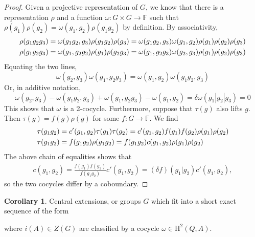 \documentclass{article}
\theoremstyle{definition}
\theoremstyle{definition}
\newtheorem{cor}{Corollary}
\newcommand{\F}{\mathbb F}
\newcommand{\cohom}{\mathrm H}
\begin{document}
\begin{proof}
Given a projective representation of $G$, we know that there is a representation $\rho$ and a function $\omega : G \times G \to \F$ such that $\rho(g_1)\rho(g_2) = \omega(g_1, g_2)\rho(g_1g_2)$ by definition. By associativity,
\begin{align}
\rho(g_1g_2g_3) &= \omega(g_1g_2, g_3)\rho(g_1g_2)\rho(g_3) = \omega(g_1g_2, g_3)\omega(g_1, g_2)\rho(g_1)\rho(g_2)\rho(g_3) \notag \\
\rho(g_1g_2g_3) &= \omega(g_1, g_2g_2)\rho(g_1)\rho(g_2g_3) = \omega(g_1, g_2g_3)\omega(g_2,g_3)\rho(g_1)\rho(g_2)\rho(g_3)
\end{align}
Equating the two lines,
\begin{equation}
\omega(g_2, g_3) \omega(g_1, g_2g_3) = \omega(g_1, g_2)\omega(g_1g_2, g_3)
\end{equation}
Or, in additive notation,
\begin{equation}
\omega(g_2, g_3) -\omega(g_1g_2, g_3) +\omega(g_1, g_2g_3) - \omega(g_1, g_2) = \delta \omega(g_1| g_2| g_3) = 0
\end{equation}
This shows that $\omega$ is a 2-cocycle. Furthermore, suppose that $\tau(g)$ also lifts $g$. Then $\tau(g) = f(g)\rho(g)$ for some $f:G \to \F$. We find
\begin{align}
 \tau(g_1g_2) &= c'(g_1, g_2)\tau(g_1)\tau(g_2) = c'(g_1,g_2)f(g_1)f(g_2)\rho(g_1)\rho(g_2) \notag\\
 \tau(g_1g_2) &= f(g_1g_2)\rho(g_1g_2) = f(g_1g_2)c(g_1, g_2)\rho(g_1)\rho(g_2)
\end{align}
The above chain of equalities shows that 
\begin{align}
c(g_1,g_2) = \frac{f(g_1)f(g_2)}{f(g_1g_2)}c'(g_1,g_2) = (\delta f)(g_1|g_2)c'(g_1, g_2),
\end{align}
so the two cocycles differ by a coboundary.
\end{proof}

\begin{cor}
\label{cor:central-extensions}
Central extensions, or groups $G$ which fit into a short exact sequence of the form
\begin{center}
\end{center}
where $i(A) \in Z(G)$
are classified by a cocycle $\omega \in \cohom^2(Q, A)$.
\end{cor}
\end{document}
